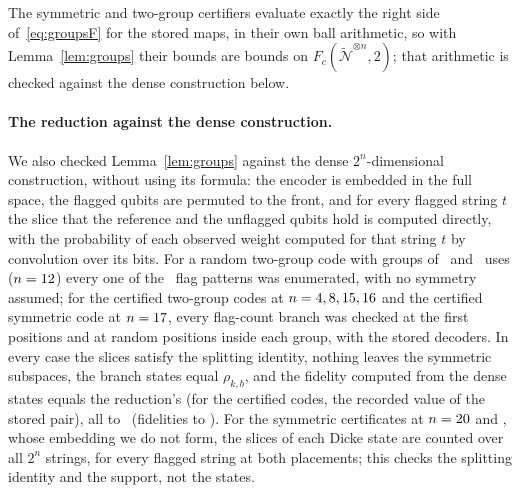 \documentclass[aps,pra,twocolumn,superscriptaddress,nofootinbib,longbibliography,floatfix]{revtex4-2}
\newcommand{\nt}{\widetilde{\mathcal N}}
\begin{document}
\noindent The symmetric and two-group certifiers evaluate exactly the right side of~\eqref{eq:groupsF} for the stored maps, in their own ball arithmetic, so with Lemma~\ref{lem:groups} their bounds are bounds on $F_c(\nt^{\otimes n},2)$; that arithmetic is checked against the dense construction below.

\paragraph*{The reduction against the dense construction.} We also checked Lemma~\ref{lem:groups} against the dense $2^n$-dimensional construction, without using its formula: the encoder is embedded in the full space, the flagged qubits are permuted to the front, and for every flagged string $t$ the slice that the reference and the unflagged qubits hold is computed directly, with the probability of each observed weight computed for that string $t$ by convolution over its bits. For a random two-group code with groups of \RedA\ and \RedB\ uses ($n=12$) every one of the \RedPatterns\ flag patterns was enumerated, with no symmetry assumed; for the certified two-group codes at $n=4,8,15,16$ and the certified symmetric code at $n=17$, every flag-count branch was checked at the first positions and at random positions inside each group, with the stored decoders. In every case the slices satisfy the splitting identity, nothing leaves the symmetric subspaces, the branch states equal $\rho_{k,b}$, and the fidelity computed from the dense states equals the reduction's (for the certified codes, the recorded value of the stored pair), all to \RedDevMax\ (fidelities to \RedFidMax). For the symmetric certificates at $n=20$ and \SymCertN, whose embedding we do not form, the slices of each Dicke state are counted over all $2^n$ strings, for every flagged string at both placements; this checks the splitting identity and the support, not the states.
\end{document}
